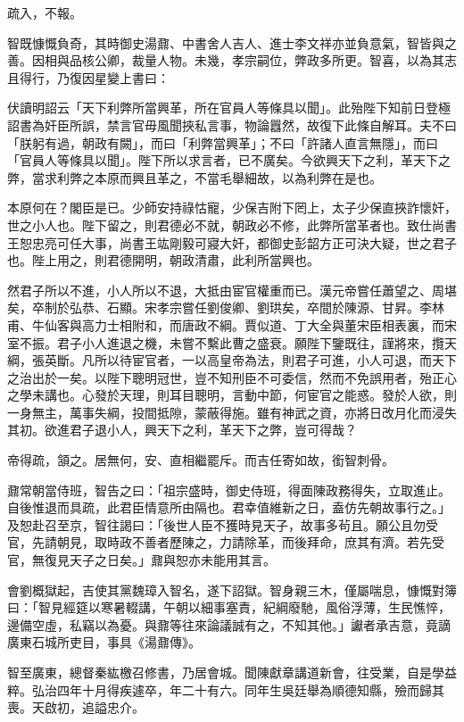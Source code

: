 \begin{pinyinscope}
疏入，不報。

智既慷慨負奇，其時御史湯鼐、中書舍人吉人、進士李文祥亦並負意氣，智皆與之善。因相與品核公卿，裁量人物。未幾，孝宗嗣位，弊政多所更。智喜，以為其志且得行，乃復因星變上書曰：

伏讀明詔云「天下利弊所當興革，所在官員人等條具以聞」。此殆陛下知前日登極詔書為奸臣所誤，禁言官毋風聞挾私言事，物論囂然，故復下此條自解耳。夫不曰「朕躬有過，朝政有闕」，而曰「利弊當興革」；不曰「許諸人直言無隱」，而曰「官員人等條具以聞」。陛下所以求言者，已不廣矣。今欲興天下之利，革天下之弊，當求利弊之本原而興且革之，不當毛舉細故，以為利弊在是也。

本原何在？閣臣是已。少師安持祿怙寵，少保吉附下罔上，太子少保直挾詐懷奸，世之小人也。陛下留之，則君德必不就，朝政必不修，此弊所當革者也。致仕尚書王恕忠亮可任大事，尚書王竑剛毅可寢大奸，都御史彭韶方正可決大疑，世之君子也。陛上用之，則君德開明，朝政清肅，此利所當興也。

然君子所以不進，小人所以不退，大抵由宦官權重而已。漢元帝嘗任蕭望之、周堪矣，卒制於弘恭、石顯。宋孝宗嘗任劉俊卿、劉珙矣，卒間於陳源、甘昇。李林甫、牛仙客與高力士相附和，而唐政不綱。賈似道、丁大全與董宋臣相表裏，而宋室不振。君子小人進退之機，未嘗不繫此曹之盛衰。願陛下鑒既往，謹將來，攬天綱，張英斷。凡所以待宦官者，一以高皇帝為法，則君子可進，小人可退，而天下之治出於一矣。以陛下聰明冠世，豈不知刑臣不可委信，然而不免誤用者，殆正心之學未講也。心發於天理，則耳目聰明，言動中節，何宦官之能惑。發於人欲，則一身無主，萬事失綱，投間抵隙，蒙蔽得施。雖有神武之資，亦將日改月化而浸失其初。欲進君子退小人，興天下之利，革天下之弊，豈可得哉？

帝得疏，頷之。居無何，安、直相繼罷斥。而吉任寄如故，銜智刺骨。

鼐常朝當侍班，智告之曰：「祖宗盛時，御史侍班，得面陳政務得失，立取進止。自後惟退而具疏，此君臣情意所由隔也。君幸值維新之日，盍仿先朝故事行之。」及恕赴召至京，智往謁曰：「後世人臣不獲時見天子，故事多茍且。願公且勿受官，先請朝見，取時政不善者歷陳之，力請除革，而後拜命，庶其有濟。若先受官，無復見天子之日矣。」鼐與恕亦未能用其言。

會劉概獄起，吉使其黨魏璋入智名，遂下詔獄。智身親三木，僅屬喘息，慷慨對簿曰：「智見經筵以寒暑輟講，午朝以細事塞責，紀綱廢馳，風俗浮薄，生民憔悴，邊備空虛，私竊以為憂。與鼐等往來論議誠有之，不知其他。」讞者承吉意，竟謫廣東石城所吏目，事具《湯鼐傳》。

智至廣東，總督秦紘檄召修書，乃居會城。聞陳獻章講道新會，往受業，自是學益粹。弘治四年十月得疾遽卒，年二十有六。同年生吳廷舉為順德知縣，殮而歸其喪。天啟初，追謚忠介。


\end{pinyinscope}

